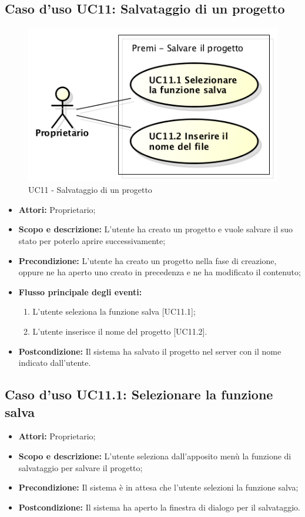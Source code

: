 \subsection{Caso d'uso UC11: Salvataggio di un progetto}
\begin{figure}[h] 
	\centering 
	\includegraphics[scale=0.45] {img/UC11.png}
	\caption{UC11 - Salvataggio di un progetto} 
\end{figure}

\begin{itemize}
	\item \textbf{Attori:} Proprietario;
	\item \textbf{Scopo e descrizione:} L'utente ha creato un progetto e vuole salvare il suo stato per poterlo aprire successivamente;
	\item \textbf{Precondizione:} L'utente ha creato un progetto nella fase di creazione, oppure ne ha aperto uno creato in precedenza e ne ha modificato il contenuto;
	\item \textbf{Flusso principale degli eventi:}
	\begin{enumerate}
		\item L'utente seleziona la funzione salva [UC11.1];
		\item L'utente inserisce il nome del progetto [UC11.2].
	\end{enumerate}
	\item \textbf{Postcondizione:} Il sistema ha salvato il progetto nel server con il nome indicato dall'utente.
\end{itemize}


\subsection{Caso d'uso UC11.1: Selezionare la funzione salva}
\begin{itemize}
	\item \textbf{Attori:} Proprietario;
	\item \textbf{Scopo e descrizione:} L'utente seleziona dall'apposito menù la funzione di salvataggio per salvare il progetto;
	\item \textbf{Precondizione:} Il sistema è in attesa che l'utente selezioni la funzione salva;
	\item \textbf{Postcondizione:} Il sistema ha aperto la finestra di dialogo per il salvataggio.
\end{itemize}


